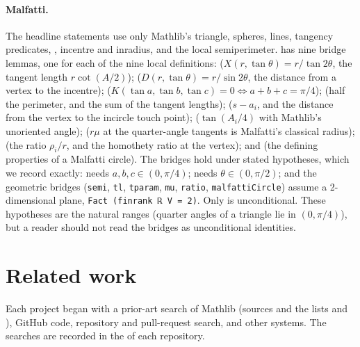 \documentclass[11pt]{article}
\theoremstyle{definition}
\theoremstyle{remark}
\newcommand{\lean}[1]{\texttt{#1}}
\begin{document}
\paragraph{Malfatti.} The headline statements use only Mathlib's triangle, spheres, lines,
tangency predicates, , incentre and inradius, and the local semiperimeter.
 has nine bridge lemmas, one for each of the nine local definitions:
 ($X(r,\tan\theta)=r/\tan2\theta$, the tangent length $r\cot(A/2)$);
 ($D(r,\tan\theta)=r/\sin2\theta$, the distance from a vertex to the
incentre);  ($K(\tan a,\tan b,\tan c)=0\iff a+b+c=\pi/4$);
 (half the perimeter, and the sum of the tangent lengths);
 ($s-a_i$, and the distance from the vertex to the incircle touch point);
 ($\tan(A_i/4)$ with Mathlib's unoriented angle);
 ($r\mu$ at the quarter-angle tangents is Malfatti's classical radius);
 (the ratio $\rho_i/r$, and the homothety ratio at the vertex); and
 (the defining properties of a Malfatti circle). The bridges
hold under stated hypotheses, which we record exactly:  needs
$a,b,c\in(0,\pi/4)$;  needs $\theta\in(0,\pi/2)$; and the geometric bridges
(\lean{semi}, \lean{tl}, \lean{tparam}, \lean{mu}, \lean{ratio}, \lean{malfattiCircle}) assume a
2-dimensional plane, \lean{Fact (finrank ℝ V = 2)}. Only  is
unconditional. These hypotheses are the natural ranges (quarter angles of a triangle lie in
$(0,\pi/4)$), but a reader should not read the bridges as unconditional identities.

\section{Related work}\label{sec:related}

Each project began with a prior-art search of Mathlib (sources and the lists 
and ), GitHub code, repository and pull-request search, and other systems.
The searches are recorded in the  of each repository.
\end{document}
